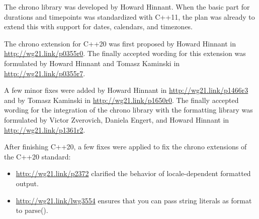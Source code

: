 The chrono library was developed by Howard Hinnant. When the basic part for durations and timepoints was standardized with C++11, the plan was already to extend this with support for dates, calendars, and timezones.

The chrono extension for C++20 was first proposed by Howard Hinnant in \url{http://wg21.link/p0355r0}. The finally accepted wording for this extension was formulated by Howard Hinnant and Tomasz Kaminski in \url{http://wg21.link/p0355r7}.

A few minor fixes were added by Howard Hinnant in \url{http://wg21.link/p1466r3} and by Tomasz Kaminski in \url{http://wg21.link/p1650r0}. The finally accepted wording for the integration of the chrono library with the formatting library was formulated by Victor Zverovich, Daniela Engert, and Howard Hinnant in \url{http://wg21.link/p1361r2}.

After finishing C++20, a few fixes were applied to fix the chrono extensions of the C++20 standard:

\begin{itemize}
\item 
\url{http://wg21.link/p2372} clarified the behavior of locale-dependent formatted output.

\item 
\url{http://wg21.link/lwg3554} ensures that you can pass string literals as format to parse().
\end{itemize}
